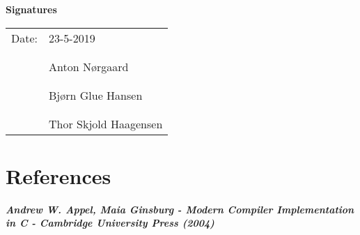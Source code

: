 \documentclass{article}
\begin{document}
\textbf{Signatures}

\begin{tabular}{@{}p{.5in}p{4in}@{}}
    Date: & 23-5-2019 & \\
     & \\
     & \hrulefill  \\
     & Anton Nørgaard \\
     & \\
     & \hrulefill \\
     & Bjørn Glue Hansen \\
     & \\
     & \hrulefill \\
     & Thor Skjold Haagensen \\
\end{tabular}

\newpage
\section{References}
\textit{\textbf{Andrew W. Appel, Maia Ginsburg - Modern Compiler Implementation in C - Cambridge University Press (2004)}}

\newpage
\appendix
\end{document}
